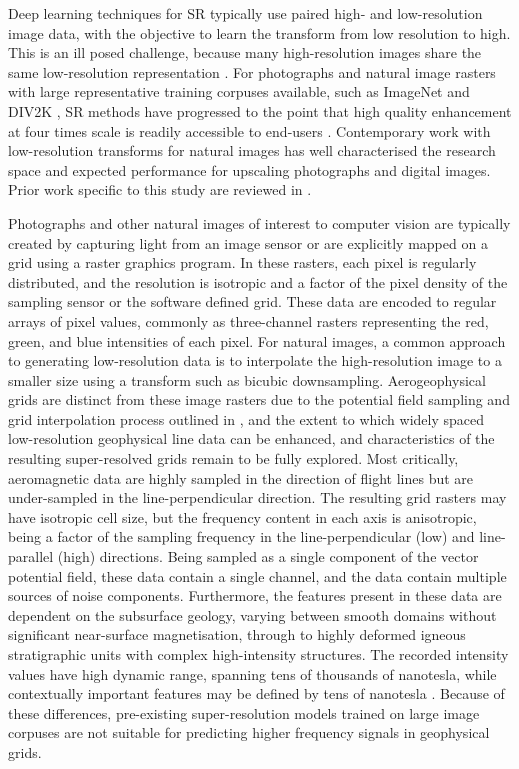 Deep learning techniques for SR typically use paired high- and low-resolution image data, with the objective to learn the transform from low resolution to high.
This is an ill posed challenge, because many high-resolution images share the same low-resolution representation \parencite{dongImageSuperresolutionUsing2016}.
For photographs and natural image rasters with large representative training corpuses available, such as ImageNet \parencite{dengImageNetLargescaleHierarchical2009} and DIV2K \parencite{agustssonNTIRE2017Challenge2017}, SR methods have progressed to the point that high quality enhancement at four times scale is readily accessible to end-users \parencite[e.g.][]{wangRealESRGANTrainingRealWorld2021}.
Contemporary work with low-resolution transforms for natural images \parencite[reviewed in][]{moserHitchhikerGuideSuperResolution2023} has well characterised the research space and expected performance for upscaling photographs and digital images.
Prior work specific to this study are reviewed in .

Photographs and other natural images of interest to computer vision are typically created by capturing light from an image sensor or are explicitly mapped on a grid using a raster graphics program.
In these rasters, each pixel is regularly distributed, and the resolution is isotropic and a factor of the pixel density of the sampling sensor or the software defined grid.
These data are encoded to regular arrays of pixel values, commonly as three-channel rasters representing the red, green, and blue intensities of each pixel.
For natural images, a common approach to generating low-resolution data is to interpolate the high-resolution image to a smaller size using a transform such as bicubic downsampling.
Aerogeophysical grids are distinct from these image rasters due to the potential field sampling and grid interpolation process outlined in , and the extent to which widely spaced low-resolution geophysical line data can be enhanced, and characteristics of the resulting super-resolved grids remain to be fully explored.
Most critically, aeromagnetic data are highly sampled in the direction of flight lines but are under-sampled in the line-perpendicular direction.
The resulting grid rasters may have isotropic cell size, but the frequency content in each axis is anisotropic, being a factor of the sampling frequency in the line-perpendicular (low) and line-parallel (high) directions.
Being sampled as a single component of the vector potential field, these data contain a single channel, and the data contain multiple sources of noise components.
Furthermore, the features present in these data are dependent on the subsurface geology, varying between smooth domains without significant near-surface magnetisation, through to highly deformed igneous stratigraphic units with complex high-intensity structures.
The recorded intensity values have high dynamic range, spanning tens of thousands of nanotesla, while contextually important features may be defined by tens of nanotesla \parencite{kovesiPhasePreservingTone2012}.
Because of these differences, pre-existing super-resolution models trained on large image corpuses are not suitable for predicting higher frequency signals in geophysical grids.

